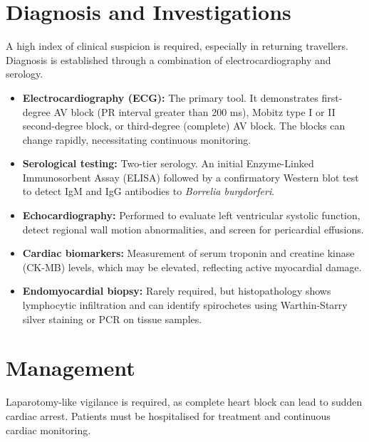 \section*{Diagnosis and Investigations}
A high index of clinical suspicion is required, especially in returning travellers. Diagnosis is established through a combination of electrocardiography and serology.

\begin{itemize}
    \item \textbf{Electrocardiography (ECG):} The primary tool. It demonstrates first-degree AV block (PR interval greater than 200 ms), Mobitz type I or II second-degree block, or third-degree (complete) AV block. The blocks can change rapidly, necessitating continuous monitoring.
    \item \textbf{Serological testing:} Two-tier serology. An initial Enzyme-Linked Immunosorbent Assay (ELISA) followed by a confirmatory Western blot test to detect IgM and IgG antibodies to \textit{Borrelia burgdorferi}.
    \item \textbf{Echocardiography:} Performed to evaluate left ventricular systolic function, detect regional wall motion abnormalities, and screen for pericardial effusions.
    \item \textbf{Cardiac biomarkers:} Measurement of serum troponin and creatine kinase (CK-MB) levels, which may be elevated, reflecting active myocardial damage.
    \item \textbf{Endomyocardial biopsy:} Rarely required, but histopathology shows lymphocytic infiltration and can identify spirochetes using Warthin-Starry silver staining or PCR on tissue samples.
\end{itemize}

\section*{Management}
Laparotomy-like vigilance is required, as complete heart block can lead to sudden cardiac arrest. Patients must be hospitalised for treatment and continuous cardiac monitoring.

